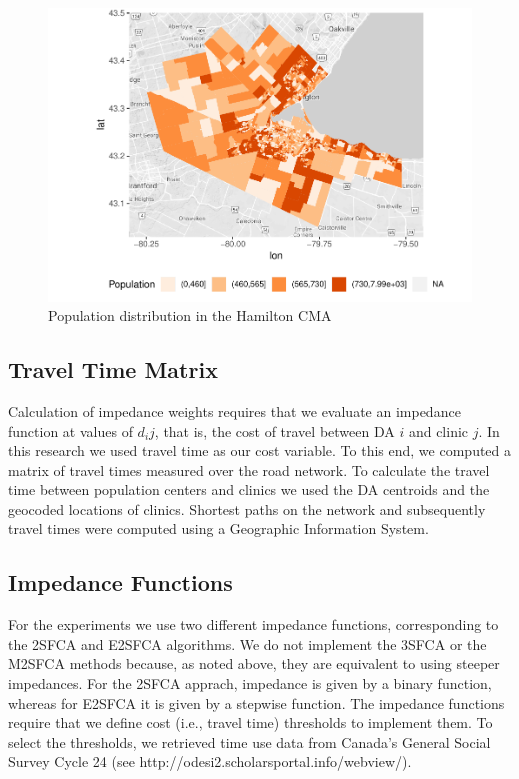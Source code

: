 \documentclass[10pt,letterpaper]{article}
\begin{document}
\begin{figure}
\includegraphics[width=0.95\linewidth]{Supply_and_Demand_Inflation_in_FCA_Methods_v2.0_files/figure-latex/fig9-population-map-1} \caption{\label{fig:fig9-population-map}Population distribution in the Hamilton CMA}\label{fig:fig9-population-map}
\end{figure}

\subsection{Travel Time Matrix}\label{travel-time-matrix}

Calculation of impedance weights requires that we evaluate an impedance
function at values of \(d_ij\), that is, the cost of travel between DA
\(i\) and clinic \(j\). In this research we used travel time as our cost
variable. To this end, we computed a matrix of travel times measured
over the road network. To calculate the travel time between population
centers and clinics we used the DA centroids and the geocoded locations
of clinics. Shortest paths on the network and subsequently travel times
were computed using a Geographic Information System.

\subsection{Impedance Functions}\label{impedance-functions}

For the experiments we use two different impedance functions,
corresponding to the 2SFCA and E2SFCA algorithms. We do not implement
the 3SFCA or the M2SFCA methods because, as noted above, they are
equivalent to using steeper impedances. For the 2SFCA apprach, impedance
is given by a binary function, whereas for E2SFCA it is given by a
stepwise function. The impedance functions require that we define cost
(i.e., travel time) thresholds to implement them. To select the
thresholds, we retrieved time use data from Canada's General Social
Survey Cycle 24 (see http://odesi2.scholarsportal.info/webview/).
\end{document}
